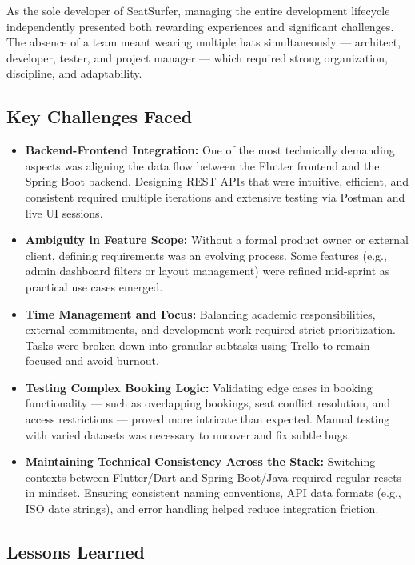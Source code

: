 \documentclass[12pt,a4paper]{report} %
\begin{document}
As the sole developer of SeatSurfer, managing the entire development lifecycle independently presented both rewarding experiences and significant challenges. The absence of a team meant wearing multiple hats simultaneously — architect, developer, tester, and project manager — which required strong organization, discipline, and adaptability.

\subsection*{Key Challenges Faced}

\begin{itemize}
\item \textbf{Backend-Frontend Integration:}
One of the most technically demanding aspects was aligning the data flow between the Flutter frontend and the Spring Boot backend. Designing REST APIs that were intuitive, efficient, and consistent required multiple iterations and extensive testing via Postman and live UI sessions.
\item \textbf{Ambiguity in Feature Scope:}  
Without a formal product owner or external client, defining requirements was an evolving process. Some features (e.g., admin dashboard filters or layout management) were refined mid-sprint as practical use cases emerged.
\item \textbf{Time Management and Focus:}  
Balancing academic responsibilities, external commitments, and development work required strict prioritization. Tasks were broken down into granular subtasks using Trello to remain focused and avoid burnout.
\item \textbf{Testing Complex Booking Logic:}  
Validating edge cases in booking functionality — such as overlapping bookings, seat conflict resolution, and access restrictions — proved more intricate than expected. Manual testing with varied datasets was necessary to uncover and fix subtle bugs.
\item \textbf{Maintaining Technical Consistency Across the Stack:}  
Switching contexts between Flutter/Dart and Spring Boot/Java required regular resets in mindset. Ensuring consistent naming conventions, API data formats (e.g., ISO date strings), and error handling helped reduce integration friction.
\end{itemize}

\subsection*{Lessons Learned}
\end{document}
